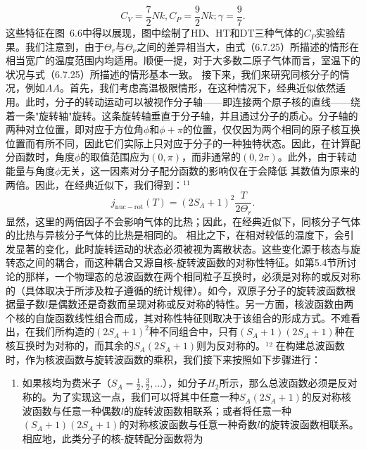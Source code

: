 \begin{equation}\tag{6.5.29}\label{eq:6.5.29}
C _ { V } = \frac { 7 } { 2 } N k ,  C _ { P } = \frac { 9 } { 2 } N k ;  \gamma = \frac { 9 } { 7 } .
\end{equation}
这些特征在图~6.6中得以展现，图中绘制了HD、HT和DT三种气体的\(C_{P}\)实验结果。我们注意到，由于\(\Theta_{r}\)与\(\Theta_{\nu}\)之间的差异相当大，由式（6.7.25）所描述的情形在相当宽广的温度范围内均适用。顺便一提，对于大多数二原子气体而言，室温下的状况与式（6.7.25）所描述的情形基本一致。
接下来，我们来研究同核分子的情况，例如\(AA\)。首先，我们考虑高温极限情形，在这种情况下，经典近似依然适用。此时，分子的转动运动可以被视作分子轴——即连接两个原子核的直线——绕着一条"旋转轴"旋转。这条旋转轴垂直于分子轴，并且通过分子的质心。分子轴的两种对立位置，即对应于方位角\(\phi\)和\(\phi + \pi\)的位置，仅仅因为两个相同的原子核互换位置而有所不同，因此它们实际上只对应于分子的一种独特状态。因此，在计算配分函数时，角度\(\phi\)的取值范围应为\((0, \pi)\)，而非通常的\((0, 2\pi)\)。此外，由于转动能量与角度\(\phi\)无关，这一因素对分子配分函数的影响仅在于会降低
其数值为原来的两倍。因此，在经典近似下，我们得到：\(^{11}\)
\begin{equation}\tag{6.5.30}\label{eq:6.5.30}
j _ { \mathrm { n u c - r o t } } ( T ) = ( 2 S _ { A } + 1 ) ^{2} \frac { T } { 2 \Theta _ { r } } .
\end{equation}
显然，这里的两倍因子不会影响气体的比热；因此，在经典近似下，同核分子气体的比热与异核分子气体的比热是相同的。
相比之下，在相对较低的温度下，会引发显著的变化，此时旋转运动的状态必须被视为离散状态。这些变化源于核态与旋转态之间的耦合，而这种耦合又源自核-旋转波函数的对称性特征。如第5.4节所讨论的那样，一个物理态的总波函数在两个相同粒子互换时，必须是对称的或反对称的（具体取决于所涉及粒子遵循的统计规律）。如今，双原子分子的旋转波函数根据量子数\(l\)是偶数还是奇数而呈现对称或反对称的特性。另一方面，核波函数由两个核的自旋函数线性组合而成，其对称性特征则取决于该组合的形成方式。不难看出，在我们所构造的\((2S_{A}+1)^{2}\)种不同组合中，只有\((S_{A}+1)(2S_{A}+1)\)种在核互换时为对称的，而其余的\(S_{A}(2S_{A}+1)\)则为反对称的。¹² 在构建总波函数时，作为核波函数与旋转波函数的乘积，我们接下来按照如下步骤进行：
\begin{enumerate}
\def\labelenumi{(\roman{enumi})}
\item
  如果核均为费米子（\(S_{A}=\frac{1}{2},\frac{3}{2},\ldots\)），如分子\(H_{2}\)所示，那么总波函数必须是反对称的。为了实现这一点，我们可以将其中任意一种\(S_{A}(2S_{A}+1)\)的反对称核波函数与任意一种偶数\(l\)的旋转波函数相联系；或者将任意一种\((S_{A}+1)(2S_{A}+1)\)的对称核波函数与任意一种奇数\(l\)的旋转波函数相联系。相应地，此类分子的核-旋转配分函数将为
\end{enumerate}
